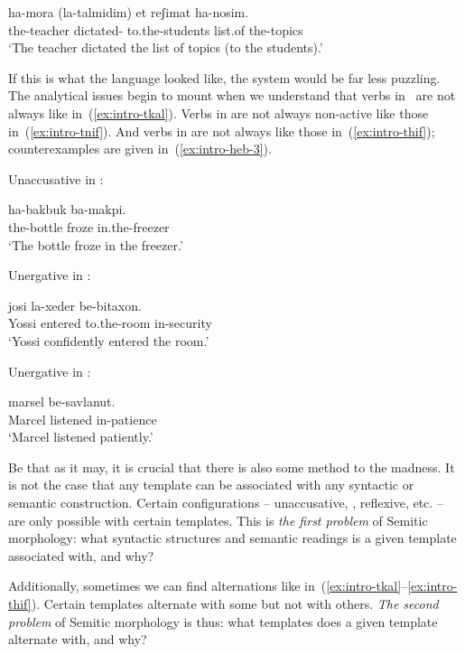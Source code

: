 \begin{exe}
\begin{xlist}
\begin{exe}
\begin{exe}
\begin{exe}
 		\gll  ha-mora  (la-talmidim) et reʃimat ha-nosim.\\
 		  the-teacher dictated- to.the-students  list.of the-topics\\
 		\glt `The teacher dictated the list of topics (to the students).' 
	
 \z 

If this is what the language looked like, the system would be far less puzzling. The analytical issues begin to mount when we understand that verbs in~{\tkal} are not always  like in~(\ref{ex:intro-tkal}). Verbs in {\tnif} are not always non-active like those in~(\ref{ex:intro-tnif}). And verbs in {\thif} are not always  like those in~(\ref{ex:intro-thif}); counterexamples are given in~(\ref{ex:intro-heb-3}).

 \begin{exe}
 \ex  \label{ex:intro-heb-3}
 \begin{xlist} 
 	\ex  Unaccusative in {\tkal}: 
		
 		\gll  ha-bakbuk  ba-makpi.\\
 		  the-bottle froze in.the-freezer\\
 		\glt `The bottle froze in the freezer.' 
		
 	\ex  Unergative in {\tnif}: 
		
 		\gll  josi  la-xeder be-bitaxon.\\
 		  Yossi entered to.the-room in-security\\
 		\glt `Yossi confidently entered the room.' 
	
 	\ex  Unergative in {\thif}: 
		
 		\gll  marsel  be-savlanut.\\
 		  Marcel listened in-patience\\
 		\glt `Marcel listened patiently.' 
	
 \z
\z 

Be that as it may, it is crucial that there is also some method to the madness. It is not the case that any template can be associated with any syntactic or semantic construction. Certain configurations -- unaccusative, , reflexive, etc. -- are only possible with certain templates. This is \textit{the first problem} of Semitic morphology: what syntactic structures and semantic readings is a given template associated with, and why?

Additionally, sometimes we can find alternations like in~(\ref{ex:intro-tkal}--\ref{ex:intro-thif}). Certain templates alternate with some but not with others. \textit{The second problem} of Semitic morphology is thus: what templates does a given template alternate with, and why?


\end{xlist}
\end{exe}
\end{exe}
\end{exe}
\end{exe}
\end{xlist}
\end{exe}
